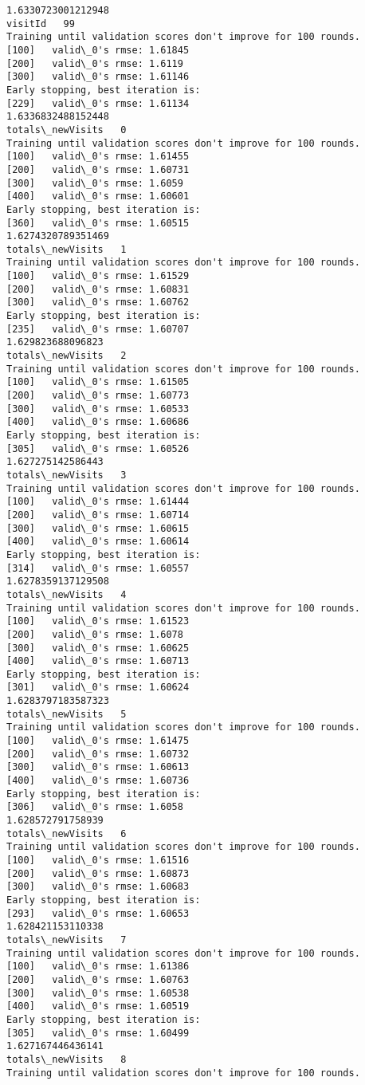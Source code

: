 \documentclass[11pt]{article}
\begin{document}
\begin{Verbatim}[commandchars=\\\{\}]
1.6330723001212948
visitId   99
Training until validation scores don't improve for 100 rounds.
[100]	valid\_0's rmse: 1.61845
[200]	valid\_0's rmse: 1.6119
[300]	valid\_0's rmse: 1.61146
Early stopping, best iteration is:
[229]	valid\_0's rmse: 1.61134
1.6336832488152448
totals\_newVisits   0
Training until validation scores don't improve for 100 rounds.
[100]	valid\_0's rmse: 1.61455
[200]	valid\_0's rmse: 1.60731
[300]	valid\_0's rmse: 1.6059
[400]	valid\_0's rmse: 1.60601
Early stopping, best iteration is:
[360]	valid\_0's rmse: 1.60515
1.6274320789351469
totals\_newVisits   1
Training until validation scores don't improve for 100 rounds.
[100]	valid\_0's rmse: 1.61529
[200]	valid\_0's rmse: 1.60831
[300]	valid\_0's rmse: 1.60762
Early stopping, best iteration is:
[235]	valid\_0's rmse: 1.60707
1.629823688096823
totals\_newVisits   2
Training until validation scores don't improve for 100 rounds.
[100]	valid\_0's rmse: 1.61505
[200]	valid\_0's rmse: 1.60773
[300]	valid\_0's rmse: 1.60533
[400]	valid\_0's rmse: 1.60686
Early stopping, best iteration is:
[305]	valid\_0's rmse: 1.60526
1.627275142586443
totals\_newVisits   3
Training until validation scores don't improve for 100 rounds.
[100]	valid\_0's rmse: 1.61444
[200]	valid\_0's rmse: 1.60714
[300]	valid\_0's rmse: 1.60615
[400]	valid\_0's rmse: 1.60614
Early stopping, best iteration is:
[314]	valid\_0's rmse: 1.60557
1.6278359137129508
totals\_newVisits   4
Training until validation scores don't improve for 100 rounds.
[100]	valid\_0's rmse: 1.61523
[200]	valid\_0's rmse: 1.6078
[300]	valid\_0's rmse: 1.60625
[400]	valid\_0's rmse: 1.60713
Early stopping, best iteration is:
[301]	valid\_0's rmse: 1.60624
1.6283797183587323
totals\_newVisits   5
Training until validation scores don't improve for 100 rounds.
[100]	valid\_0's rmse: 1.61475
[200]	valid\_0's rmse: 1.60732
[300]	valid\_0's rmse: 1.60613
[400]	valid\_0's rmse: 1.60736
Early stopping, best iteration is:
[306]	valid\_0's rmse: 1.6058
1.628572791758939
totals\_newVisits   6
Training until validation scores don't improve for 100 rounds.
[100]	valid\_0's rmse: 1.61516
[200]	valid\_0's rmse: 1.60873
[300]	valid\_0's rmse: 1.60683
Early stopping, best iteration is:
[293]	valid\_0's rmse: 1.60653
1.628421153110338
totals\_newVisits   7
Training until validation scores don't improve for 100 rounds.
[100]	valid\_0's rmse: 1.61386
[200]	valid\_0's rmse: 1.60763
[300]	valid\_0's rmse: 1.60538
[400]	valid\_0's rmse: 1.60519
Early stopping, best iteration is:
[305]	valid\_0's rmse: 1.60499
1.627167446436141
totals\_newVisits   8
Training until validation scores don't improve for 100 rounds.

\end{Verbatim}
\end{document}
